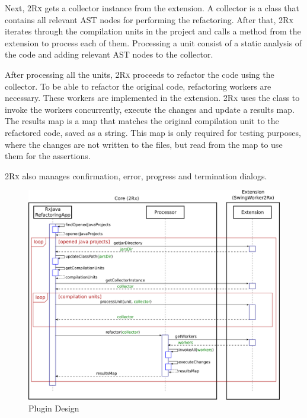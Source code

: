 \documentclass[type=bsc,accentcolor=tud9c]{tudthesis}
\newcommand{\toolcore}{\textsc{2Rx}}
\begin{document}
Next, \toolcore{} gets a collector instance from the extension. A collector is a class that contains all relevant AST nodes for performing the refactoring. After that, \toolcore{} iterates through the compilation units in the project and calls a method from the extension to process each of them. Processing a unit consist of a static analysis of the code and adding relevant AST nodes to the collector.

After processing all the units, \toolcore{} proceeds to refactor the code using the collector. To be able to refactor the original code, refactoring workers are necessary. These workers are implemented in the extension. \toolcore{} uses the class  to invoke the workers concurrently, execute the changes and update a results map. The results map is a map that matches the original compilation unit to the refactored code, saved as a string. This map is only required for testing purposes, where the changes are not written to the files, but read from the map to use them for the assertions.

\toolcore{} also manages confirmation, error, progress and termination dialogs.

\begin{figure}[h]
\begin{center}
\includegraphics[width=15cm]{design/plugin-design.png}
\end{center}
\caption{Plugin Design}
\label{fig:plugin-design}
\end{figure}
\end{document}
